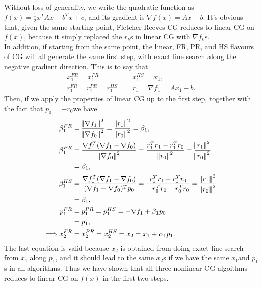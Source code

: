 \documentclass[11pt]{article}
\begin{document}
\maketitle
\section{}
Without loss of generality, we write the quadratic function as $f(x) = \frac12 x^TAx - b^Tx + c$, and its gradient is $\nabla f(x) = A x - b$. It's obvious that, given the same starting point, Fletcher-Reeves CG reduces to linear CG on $f(x)$, because it simply replaced the $r_k$s in linear CG with $\nabla f_k$s.\\[0.3cm]
In addition, if starting from the same point, the linear, FR, PR, and HS flavours of CG will all generate the same first step, with exact line search along the negative gradient direction. This is to say that 
\begin{equation}\begin{split} 
x_1^{FR} = x_1^{PR} &= x_1^{HS} = x_1, \\
r_1^{FR} = r_1^{PR} = r_1^{HS} &= r_1 = \nabla f_1 = Ax_1 - b.
\end{split}\nonumber\end{equation}
Then, if we apply the properties of linear CG up to the first step, together with the fact that $p_0 = -r_0$we have  
\begin{equation}\begin{split} 
\beta^{FR}_1 &= \frac{\norm{\nabla f_1}^2}{\norm{\nabla f_0}^2} = \frac{\norm{r_1}^2}{\norm{r_0}^2} = \beta_1, \\
\beta^{PR}_1 &= \frac{\nabla f_1^T(\nabla f_1 - \nabla f_0)}{\norm{\nabla f_0}^2} = \frac{r_1^T r_1 - r_1^T r_0}{\norm{r_0}^2} = \frac{\norm{r_1}^2}{\norm{r_0}^2} \\
&= \beta_1, \\
\beta^{HS}_1 &= \frac{\nabla f_1^T(\nabla f_1 - \nabla f_0)}{(\nabla f_1 - \nabla f_0)^Tp_0} = \frac{r_1^Tr_1 - r^T_1 r_0}{-r_1^Tr_0 + r_0^Tr_0} 
= \frac{\norm{r_1}^2}{\norm{r_0}^2} \\ 
&= \beta_1,\\
p_1^{FR} &= p_1^{PR} = p_1^{HS} = -\nabla f_1 + \beta_1 p_0\\
&= p_1,\\
\Longrightarrow x_2^{FR} &= x_2^{PR} = x_2^{HS} = x_2 = x_1 + \alpha_1 p_1.
\end{split}\nonumber\end{equation} 
The last equation is valid because $x_2$ is obtained from doing exact line search from $x_1$ along $p_1$, and it should lead to the same $x_2$s if we have the same $x_1$and $p_1$s in all algorithms. Thus we have shown that all three nonlinear CG algoithms reduces to linear CG on $f(x)$ in the first two steps. \\[0.3cm]
\end{document}
